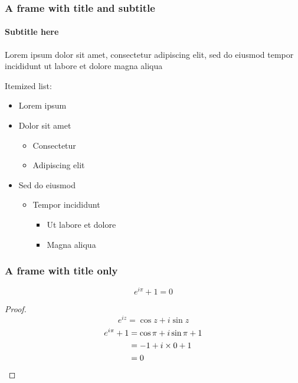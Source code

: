 \documentclass[compress,12pt]{beamer}
\begin{document}
\begin{frame}
      \frametitle{A frame with title and subtitle}
      \framesubtitle{Subtitle here}
      Lorem ipsum dolor sit amet, consectetur adipiscing elit, sed do eiusmod tempor incididunt ut labore et dolore magna aliqua \par
      Itemized list:
      \begin{itemize}
            \item Lorem ipsum
            \item Dolor sit amet
                  \begin{itemize}
                        \item Consectetur
                        \item Adipiscing elit
                  \end{itemize}
            \item Sed do eiusmod
                  \begin{itemize}
                        \item Tempor incididunt
                              \begin{itemize}
                                    \item Ut labore et dolore
                                    \item Magna aliqua
                              \end{itemize}
                  \end{itemize}
      \end{itemize}
\end{frame}

\begin{frame}
      \frametitle{A frame with title only}
      \begin{theorem}
            \[e^{i\pi}+1=0\]
            \begin{proof}
                  \begin{equation*}
                        e^{iz}=\cos{z}+i\sin{z}
                  \end{equation*}
                  \begin{align*}
                        e^{i\pi}+1 & \null=\cos\pi+i\sin\pi+1 \\
                                   & \null=-1+i\times0+1      \\
                                   & \null=0
                  \end{align*}
            \end{proof}
      \end{theorem}
\end{frame}
\end{document}
